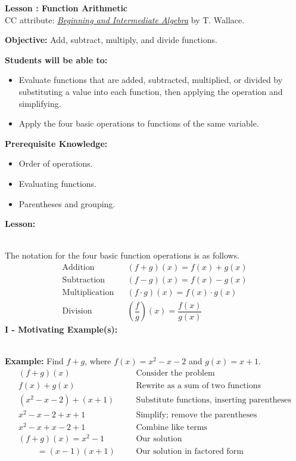 \documentclass[12pt]{article}
\theoremstyle{definition}
\begin{document}
{\bf \large Lesson : Function Arithmetic}\label{les:function_arithmetic}
\\ CC attribute: \href{http://www.wallace.ccfaculty.org/book/book.html}{\it{Beginning and Intermediate Algebra}} by T. Wallace. 
\hfill \doclicenseImage[imagewidth=5em]\\
\par
{\bf Objective:} Add, subtract, multiply, and divide functions.\\
\par
{\bf Students will be able to:}
\begin{itemize}
	\item Evaluate functions that are added, subtracted, multiplied, or divided by substituting a value into each function, then applying the operation and simplifying.
	\item Apply the four basic operations to functions of the same variable.
\end{itemize}
{\bf Prerequisite Knowledge:}
\begin{itemize}
	\item Order of operations.
	\item Evaluating functions.
	\item Parentheses and grouping.
\end{itemize}
\hrulefill

{\bf Lesson:}\\
\ \par
The notation for the four basic function operations is as follows. 
\begin{eqnarray*}
  \text{Addition} &  & (f + g) (x) = f (x) + g (x)\\
	\text{Subtraction} &  & (f - g) (x) = f (x) - g (x)\\  
	\text{Multiplication} &  & (f \cdot g) (x) = f (x)\cdot g (x)\\
	\text{Division} &  & \left(\dfrac{f}{g}\right) (x) = \dfrac{f (x)}{g (x)}
\end{eqnarray*}
{\bf I - Motivating Example(s):}\\
\ \par
{\bf Example:} Find $f+g$, where $f (x) = x^2 - x - 2$ and $g(x) = x + 1$.
  \begin{eqnarray*}
    (f + g)(x)~~~~~~~~~~ &  & \text{Consider the problem} \\
		f(x) + g(x)~~~~~~~~~ &  & \text{Rewrite as a sum of two functions}\\
		(x^2 - x - 2) + (x + 1) &  & \text{Substitute functions, inserting parentheses}\\
		x^2 - x - 2 + x + 1~~ &  & \text{Simplify; remove the parentheses}\\
		x^2 - x + x -2 + 1~~ &  & \text{Combine like terms}\\
    (f + g)(x)=x^2 - 1~~~~~~~~~~ &  & \text{Our solution}\\
    ~~~~~~~~~~=(x-1)(x+1) &  & \text{Our solution in factored form}
  \end{eqnarray*}
	
\end{document}

